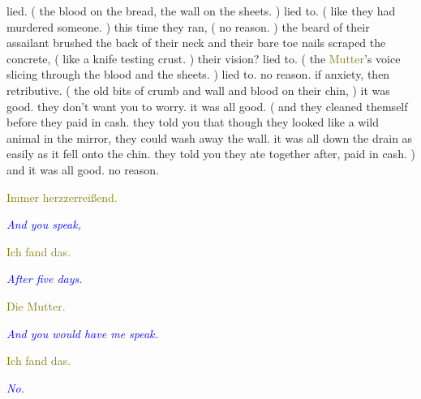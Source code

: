 \documentclass[11pt]{article}
\begin{document}
\begingroup
lied. ( the blood on the bread, the wall on the sheets. ) lied to. ( like they had murdered someone. ) this time they ran, ( no reason. ) the beard of their assailant brushed the back of their neck and their bare toe nails scraped the concrete, ( like a knife testing crust. ) their vision? lied to. ( the \textcolor{olive}{Mutter}'s voice slicing through the blood and the sheets. ) lied to. no reason. if anxiety, then retributive. ( the old bits of crumb and wall and blood on their chin, ) it was good. they don't want you to worry. it was all good. ( and they cleaned themself before they paid in cash. they told you that though they looked like a wild animal in the mirror, they could wash away the wall. it was all down the drain as easily as it fell onto the chin. they told you they ate together after, paid in cash. ) and it was all good. no reason. 
\endgroup

\begingroup
\begin{center}
\textcolor{olive}{Immer herzzerreißend.}
\end{center}
\endgroup

\begingroup
\begin{center}
\textit{\textcolor{blue}{And you speak,}}
\end{center}
\endgroup

\begingroup
\begin{center}
\textcolor{olive}{Ich fand das. }
\end{center}
\endgroup

\begingroup
\begin{center}
\textit{\textcolor{blue}{After five days.}}
\end{center}
\endgroup

\begingroup
\begin{center}
\textcolor{olive}{Die Mutter.}
\end{center}
\endgroup

\begingroup
\begin{center}
\textit{\textcolor{blue}{And you would have me speak. }}
\end{center}
\endgroup

\begingroup
\begin{center}
\textcolor{olive}{Ich fand das.}
\end{center}
\endgroup

\begingroup
\begin{center}
\textit{\textcolor{blue}{No.}}
\end{center}
\endgroup
\end{document}

